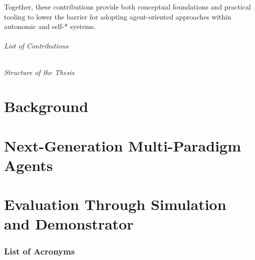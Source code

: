 \documentclass[12pt,a4paper,openright,twoside]{book}
\begin{document}
Together, these contributions provide both conceptual foundations and practical tooling to lower the barrier for adopting agent-oriented approaches within autonomic and self-* systems.


\paragraph{List of Contributions}

\paragraph{Structure of the Thesis}


\part{Background}
\label{part:background}



\part{Next-Generation Multi-Paradigm Agents} 
\label{part:nextgen}



\part{Evaluation Through Simulation and Demonstrator}




\backmatter

\listoffigures     %
\lstlistoflistings %

\section*{List of Acronyms}




\end{document}

